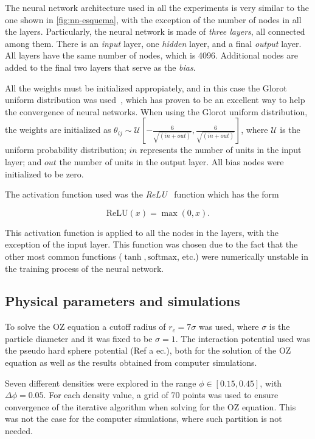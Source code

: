 The neural network architecture used in all the experiments is very similar to the one
shown in \autoref{fig:nn-esquema}, with the exception of the number of nodes in all the
layers.
Particularly, the neural network is made of \emph{three layers}, all connected among them.
There is an \emph{input} layer, one \emph{hidden} layer, and a final \emph{output} layer.
All layers have the same number of nodes, which is 4096. Additional nodes are added to the
final two layers that serve as the \emph{bias}.

All the weights must be initialized appropiately, and in this case the Glorot uniform
distribution was used~\cite{glorotUnderstandingDifficultyTraining2010}, which has proven
to be an excellent way to help the convergence of neural networks.
When using the Glorot uniform distribution, the weights are initialized as
$
\theta_{ij} \sim \mathcal{U} \left[ -\frac{6}{\sqrt{(in + out)}},
\frac{6}{\sqrt{(in + out)}} \right]
$,
where $\mathcal{U}$ is the uniform probability distribution;
$in$ represents the number of units in the input layer; and $out$ the number of
units in the output layer. All bias nodes were initialized to be zero.

The activation function used was the \emph{ReLU}~\cite{glorotDeepSparseRectifier2011}
function which has the form

\begin{equation*}
    \text{ReLU}(x) = \max{(0, x)} .
\end{equation*}

This activation function is applied to all the nodes in the layers, with the exception
of the input layer. This function was chosen due to the fact that the other most common
functions ($\tanh, \text{softmax}$, etc.) were numerically unstable in the training process 
of the neural network.

\subsection{Physical parameters and simulations}

To solve the OZ equation a cutoff radius of $r_c=7\sigma$ was used, where $\sigma$ is the
particle diameter and it was fixed to be $\sigma=1$.
The interaction potential used was the pseudo hard sphere potential (Ref a ec.), both
for the solution of the OZ equation as well as the results obtained from computer simulations.

Seven different densities were explored in the range $\phi \in [\num{0.15}, \num{0.45}]$, 
with $\Delta \phi = \num{0.05}$.
For each density value, a grid of 70 points was used to ensure convergence of the iterative
algorithm when solving for the OZ equation. This was not the case for the computer 
simulations, where such partition is not needed.

